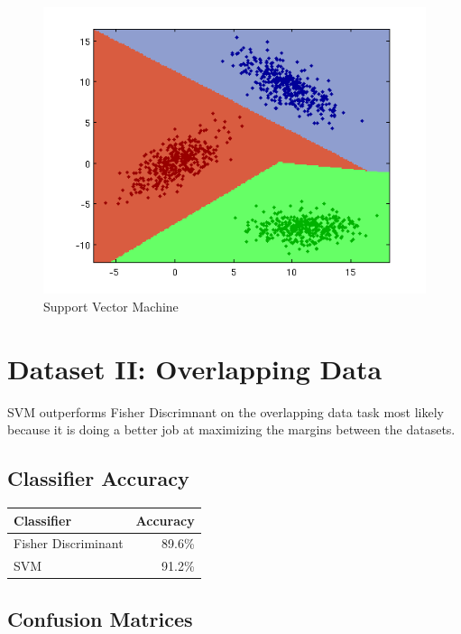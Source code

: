 \documentclass[a4paper]{article}
\begin{document}
\pagebreak
\begin{figure}[htbp!]
\center
\includegraphics[clip, trim=40px 15px 30px 10px]{svm_c.png}
\caption{Support Vector Machine}
\end{figure}	

\pagebreak
\section{Dataset II: Overlapping Data}
SVM outperforms Fisher Discrimnant on the overlapping data task most likely because it is doing
a better job at maximizing the margins between the datasets.
\subsection{Classifier Accuracy}

\begin{tabular}{ | l | r | }
\hline
\textbf{Classifier} & \textbf{Accuracy} \\
\hline
Fisher Discriminant  &   89.6\% \\
\hline
SVM          &   91.2\% \\
\hline

\end{tabular}

\subsection{Confusion Matrices}
\end{document}
